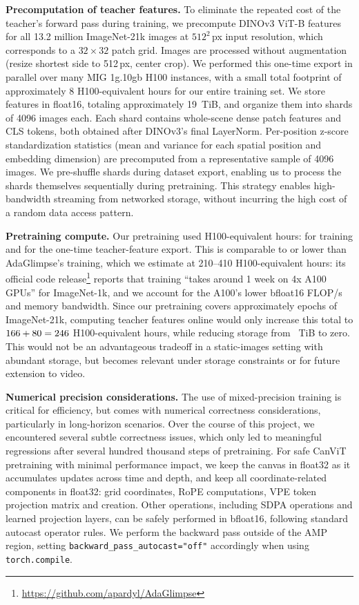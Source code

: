 \documentclass{article}
\begin{document}
\textbf{Precomputation of teacher features.}
To eliminate the repeated cost of the teacher's forward pass during training, we precompute DINOv3 ViT-B features for all 13.2 million ImageNet-21k images at $512^2$\,px input resolution, which corresponds to a $32 \times 32$ patch grid.
Images are processed without augmentation (resize shortest side to 512\,px, center crop).
We performed this one-time export in parallel over many MIG 1g.10gb H100 instances, with a small total footprint of approximately 8 H100-equivalent hours for our entire training set.
We store features in float16, totaling approximately 19~TiB, and organize them into shards of 4096 images each.
Each shard contains whole-scene dense patch features and CLS tokens, both obtained after DINOv3's final LayerNorm.
Per-position z-score standardization statistics (mean and variance for each spatial position and embedding dimension) are precomputed from a representative sample of 4096 images.
We pre-shuffle shards during dataset export, enabling us to process the shards themselves sequentially during pretraining.
This strategy enables high-bandwidth streaming from networked storage, without incurring the high cost of a random data access pattern.

\textbf{Pretraining compute.} Our pretraining used \pretrainTotalHours{} H100-equivalent hours: \pretrainHours{} for training and \teacherExportHours{} for the one-time teacher-feature export. This is comparable to or lower than AdaGlimpse's training, which we estimate at 210--410 H100-equivalent hours: its official code release\footnote{\url{https://github.com/apardyl/AdaGlimpse}} reports that training ``takes around 1 week on 4x A100 GPUs'' for ImageNet-1k, and we account for the A100's lower bfloat16 FLOP/s and memory bandwidth.
Since our pretraining covers approximately \pretrainEpochs{} epochs of ImageNet-21k, computing teacher features online would only increase this total to \mbox{$166+80=246$} H100-equivalent hours, while reducing storage from \teacherFeaturesTiB{}~TiB to zero.
This would not be an advantageous tradeoff in a static-images setting with abundant storage, but becomes relevant under storage constraints or for future extension to video.

\textbf{Numerical precision considerations.}
The use of mixed-precision training is critical for efficiency, but comes with numerical correctness considerations, particularly in long-horizon scenarios.
Over the course of this project, we encountered several subtle correctness issues, which only led to meaningful regressions after several hundred thousand steps of pretraining.
For safe CanViT pretraining with minimal performance impact, we keep the canvas in float32 as it accumulates updates across time and depth, and keep all coordinate-related components in float32: grid coordinates, \ac{RoPE} computations, VPE token projection matrix and creation.
Other operations, including \ac{SDPA} operations and learned projection layers, can be safely performed in bfloat16, following standard autocast operator rules.
We perform the backward pass outside of the AMP region, setting \texttt{backward\_pass\_autocast="off"} accordingly when using \texttt{torch.compile}.
\end{document}
